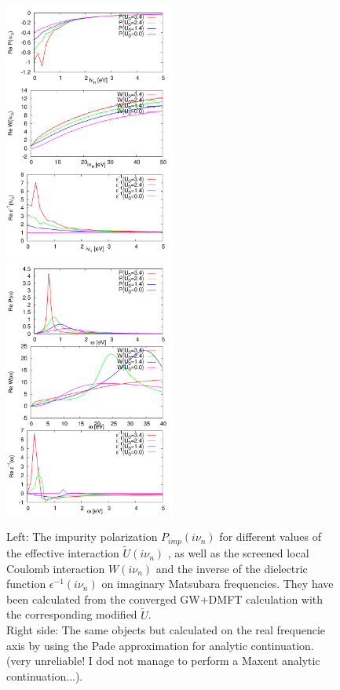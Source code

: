 \documentclass[12pt,a4paper]{scrartcl}
\numberwithin{equation}{section}
\begin{document}
\begin{figure}[h]
\includegraphics[width=0.5\textwidth]{figs/plasmonanalysis/pol.pdf} 
\includegraphics[width=0.5\textwidth]{figs/plasmonanalysis/pol_pade.pdf} 
\caption{Left: The impurity polarization $P_{imp}(i\nu_n)$
for different values of the effective interaction $\tilde{U}(i\nu_n)$ ,
as well as the screened local Coulomb interaction $W(i\nu_n)$
and the inverse of the dielectric function $\epsilon^{-1}(i\nu_n)$
on imaginary Matsubara frequencies. They have been calculated from 
the converged GW+DMFT calculation with the corresponding modified $\tilde{U}$.\\
Right side:
The same objects but calculated on the real frequencie axis
by using the Pade approximation for analytic continuation. (very unreliable! I dod not manage to
perform a Maxent analytic continuation...).
}
\end{figure}
\end{document}
